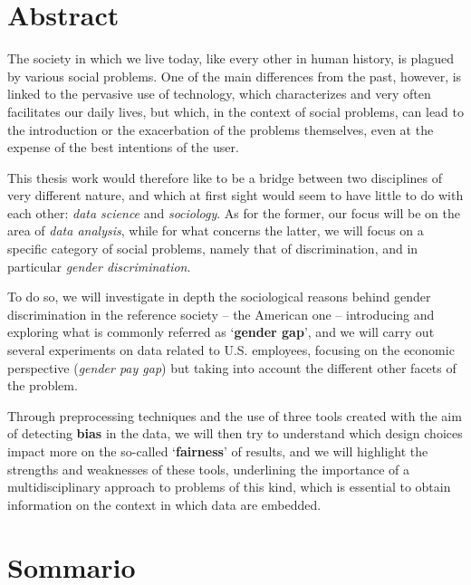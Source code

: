 
\newpage
\chapter*{Abstract}


The society in which we live today, like every other in human history, is plagued by various social problems. One of the main differences from the past, however, is linked to the pervasive use of technology, which characterizes and very often facilitates our daily lives, but which, in the context of social problems, can lead to the introduction or the exacerbation of the problems themselves, even at the expense of the best intentions of the user.

This thesis work would therefore like to be a bridge between two disciplines of very different nature, and which at first sight would seem to have little to do with each other: \textit{data science} and \textit{sociology}. As for the former, our focus will be on the area of \textit{data analysis}, while for what concerns the latter, we will focus on a specific category of social problems, namely that of discrimination, and in particular \textit{gender discrimination}.

To do so, we will investigate in depth the sociological reasons behind gender discrimination in the reference society -- the American one -- introducing and exploring what is commonly referred as `\textbf{gender gap}', and we will carry out several experiments on data related to U.S. employees, focusing on the economic perspective (\textit{gender pay gap}) but taking into account the different other facets of the problem.

Through preprocessing techniques and the use of three tools created with the aim of detecting \textbf{bias} in the data, we will then try to understand which design choices impact more on the so-called `\textbf{fairness}' of results, and we will highlight the strengths and weaknesses of these tools, underlining the importance of a multidisciplinary approach to problems of this kind, which is essential to obtain information on the context in which data are embedded.


\newpage
\chapter*{Sommario}


